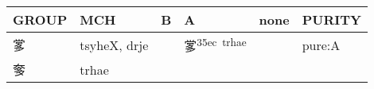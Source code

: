 \documentclass[14pt,a4paper]{scrartcl}
\begin{document}
\begin{longtable}[c]{@{}llllll@{}}
\toprule
\begin{minipage}[b]{0.14\columnwidth}\raggedright\strut
GROUP
\strut\end{minipage} &
\begin{minipage}[b]{0.14\columnwidth}\raggedright\strut
MCH
\strut\end{minipage} &
\begin{minipage}[b]{0.14\columnwidth}\raggedright\strut
B
\strut\end{minipage} &
\begin{minipage}[b]{0.14\columnwidth}\raggedright\strut
A
\strut\end{minipage} &
\begin{minipage}[b]{0.14\columnwidth}\raggedright\strut
none
\strut\end{minipage} &
\begin{minipage}[b]{0.14\columnwidth}\raggedright\strut
PURITY
\strut\end{minipage}\tabularnewline
\midrule
\endhead
\begin{minipage}[t]{0.14\columnwidth}\raggedright\strut
㗬
\strut\end{minipage} &
\begin{minipage}[t]{0.14\columnwidth}\raggedright\strut
tsyheX, drje
\strut\end{minipage} &
\begin{minipage}[t]{0.14\columnwidth}\raggedright\strut
\strut\end{minipage} &
\begin{minipage}[t]{0.14\columnwidth}\raggedright\strut
㗬\textsuperscript{35ec~trhae}
\strut\end{minipage} &
\begin{minipage}[t]{0.14\columnwidth}\raggedright\strut
\strut\end{minipage} &
\begin{minipage}[t]{0.14\columnwidth}\raggedright\strut
pure:A
\strut\end{minipage}\tabularnewline
\begin{minipage}[t]{0.14\columnwidth}\raggedright\strut
奓
\strut\end{minipage} &
\begin{minipage}[t]{0.14\columnwidth}\raggedright\strut
trhae
\strut\end{minipage} &
\begin{minipage}[t]{0.14\columnwidth}\raggedright\strut
\strut\end{minipage} &

\end{longtable}
\end{document}
